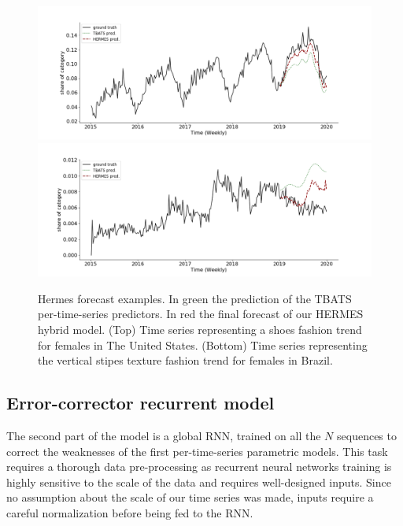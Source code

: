 \documentclass[lettersize,journal]{IEEEtran}
\begin{document}
\begin{figure}
\centering
  \includegraphics[width=\linewidth]{figure/us_female_shoes}
  \includegraphics[width=\linewidth]{figure/br_female_texture_verticalstripe}
\caption{Hermes forecast examples. In green the prediction of the TBATS per-time-series predictors. In red the final forecast of our HERMES hybrid model. (Top) Time series representing a shoes fashion trend for females in The United States. (Bottom) Time series representing the vertical stipes texture fashion trend for females in Brazil.}
\label{fig:introexamples}
\end{figure}

\subsection{Error-corrector recurrent model}

The second part of the model is a global RNN, trained on all the $N$ sequences to correct the weaknesses of the first per-time-series parametric models. This task requires a thorough data pre-processing as recurrent neural networks training is highly sensitive to the scale of the data and requires well-designed inputs. Since no assumption about the scale of our time series was made, inputs require a careful normalization before being fed to the RNN.
\end{document}
